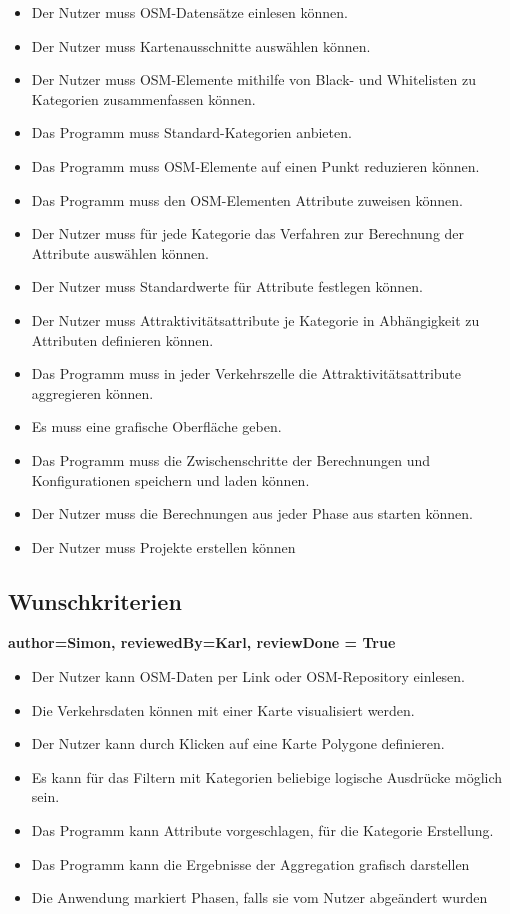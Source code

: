 \documentclass[parskip=full]{scrartcl} %
\begin{document}
\begin{itemize}
    \item Der Nutzer muss OSM-Datensätze einlesen können.
    \item Der Nutzer muss Kartenausschnitte auswählen können.
    \item Der Nutzer muss OSM-Elemente mithilfe von Black- und Whitelisten zu Kategorien zusammenfassen können.
    \item Das Programm muss Standard-Kategorien anbieten.
    \item Das Programm muss OSM-Elemente auf einen Punkt reduzieren können.
    \item Das Programm muss den OSM-Elementen Attribute zuweisen können.
    \item Der Nutzer muss für jede Kategorie das Verfahren zur Berechnung der Attribute auswählen können.
    \item Der Nutzer muss Standardwerte für Attribute festlegen können.
    \item Der Nutzer muss Attraktivitätsattribute je Kategorie in Abhängigkeit zu Attributen definieren können.
    \item Das Programm muss in jeder Verkehrszelle die Attraktivitätsattribute aggregieren können.
    \item Es muss eine grafische Oberfläche geben.
    \item Das Programm muss die Zwischenschritte der Berechnungen und Konfigurationen speichern und laden können.
    \item Der Nutzer muss die Berechnungen aus jeder Phase aus starten können.
    \item Der Nutzer muss Projekte erstellen können
\end{itemize}


\subsection{Wunschkriterien}
\textbf{author=Simon, reviewedBy=Karl, reviewDone = True\\}
\begin{itemize}
    \item Der Nutzer kann OSM-Daten per Link oder OSM-Repository einlesen.
    \item Die Verkehrsdaten können mit einer Karte visualisiert werden.
    \item Der Nutzer kann durch Klicken auf eine Karte Polygone definieren.
    \item Es kann für das Filtern mit Kategorien beliebige logische Ausdrücke möglich sein.
    \item Das Programm kann Attribute vorgeschlagen, für die Kategorie Erstellung.
    \item Das Programm kann die Ergebnisse der Aggregation grafisch darstellen
    \item Die Anwendung markiert Phasen, falls sie vom Nutzer abgeändert wurden
    
\end{itemize}
\end{document}
